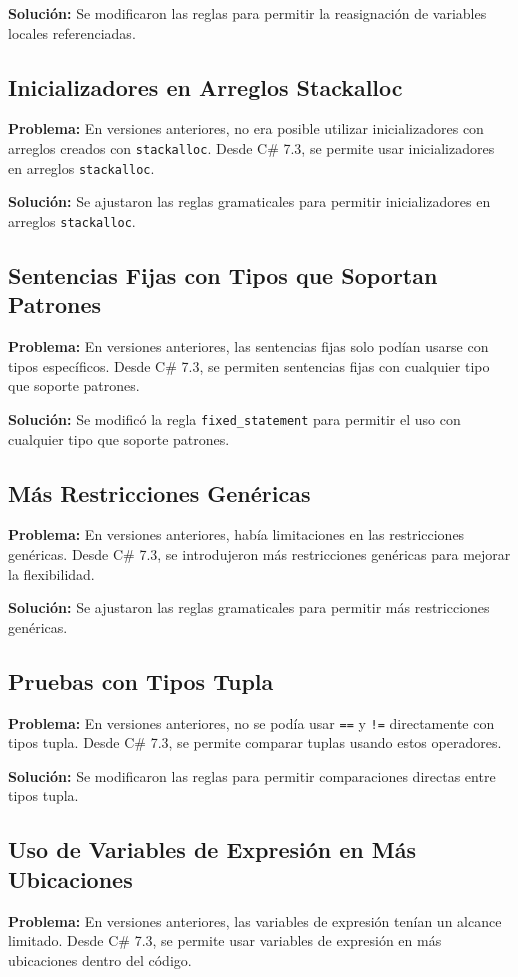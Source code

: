\textbf{Solución:} Se modificaron las reglas para permitir la reasignación de variables locales referenciadas.

\subsection{Inicializadores en Arreglos Stackalloc}
\textbf{Problema:} En versiones anteriores, no era posible utilizar inicializadores con arreglos creados con \texttt{stackalloc}. Desde C\# 7.3, se permite usar inicializadores en arreglos \texttt{stackalloc}.

\textbf{Solución:} Se ajustaron las reglas gramaticales para permitir inicializadores en arreglos \texttt{stackalloc}.

\subsection{Sentencias Fijas con Tipos que Soportan Patrones}
\textbf{Problema:} En versiones anteriores, las sentencias fijas solo podían usarse con tipos específicos. Desde C\# 7.3, se permiten sentencias fijas con cualquier tipo que soporte patrones.

\textbf{Solución:} Se modificó la regla \texttt{fixed\_statement} para permitir el uso con cualquier tipo que soporte patrones.

\subsection{Más Restricciones Genéricas}
\textbf{Problema:} En versiones anteriores, había limitaciones en las restricciones genéricas. Desde C\# 7.3, se introdujeron más restricciones genéricas para mejorar la flexibilidad.

\textbf{Solución:} Se ajustaron las reglas gramaticales para permitir más restricciones genéricas.

\subsection{Pruebas con Tipos Tupla}
\textbf{Problema:} En versiones anteriores, no se podía usar \texttt{==} y \texttt{!=} directamente con tipos tupla. Desde C\# 7.3, se permite comparar tuplas usando estos operadores.

\textbf{Solución:} Se modificaron las reglas para permitir comparaciones directas entre tipos tupla.

\subsection{Uso de Variables de Expresión en Más Ubicaciones}
\textbf{Problema:} En versiones anteriores, las variables de expresión tenían un alcance limitado. Desde C\# 7.3, se permite usar variables de expresión en más ubicaciones dentro del código.

